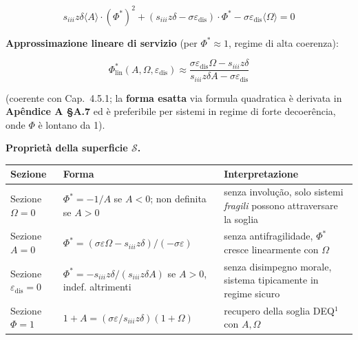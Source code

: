 \[
s_{iii} z \delta \langle A\rangle \cdot (\Phi^*)^2 + (s_{iii} z \delta - \sigma \varepsilon_{\text{dis}}) \cdot \Phi^* - \sigma \varepsilon_{\text{dis}} \langle\Omega\rangle = 0
\]

\Hypoth{} \textbf{Approssimazione lineare di servizio} (per
\(\Phi^* \approx 1\), regime di alta coerenza):

\[
\Phi^*_{\text{lin}}(A, \Omega, \varepsilon_{\text{dis}}) \approx \frac{\sigma \varepsilon_{\text{dis}} \Omega - s_{iii} z \delta}{s_{iii} z \delta A - \sigma \varepsilon_{\text{dis}}}
\]

(coerente con Cap.~4.5.1; la \textbf{forma esatta} via formula
quadratica è derivata in \textbf{Apêndice A \S{}A.7} ed è preferibile per
sistemi in regime di forte decoerência, onde \(\Phi\) è lontano da 1).

\Proved{} \textbf{Proprietà della superficie \(\mathcal{S}\).}

{\def\LTcaptype{none} %
{\small\begin{longtable}[]{@{}
  >{\raggedright\arraybackslash}p{}
  >{\raggedright\arraybackslash}p{}
  >{\raggedright\arraybackslash}p{}@{}}
\toprule\noalign{}
\begin{minipage}[b]{\linewidth}\raggedright
Sezione
\end{minipage} & \begin{minipage}[b]{\linewidth}\raggedright
Forma
\end{minipage} & \begin{minipage}[b]{\linewidth}\raggedright
Interpretazione
\end{minipage} \\
\midrule\noalign{}
\endhead
\bottomrule\noalign{}
\endlastfoot
Sezione \(\Omega = 0\) & \(\Phi^* = -1/A\) se \(A < 0\); non definita se
\(A > 0\) & senza involução, solo sistemi \emph{fragili} possono
attraversare la soglia \\
Sezione \(A = 0\) &
\(\Phi^* = (\sigma\varepsilon\Omega - s_{iii}z\delta) / (-\sigma\varepsilon)\)
& senza antifragilidade, \(\Phi^*\) cresce linearmente con \(\Omega\) \\
Sezione \(\varepsilon_{\text{dis}} = 0\) &
\(\Phi^* = -s_{iii}z\delta / (s_{iii}z\delta A)\) se \(A > 0\), indef.
altrimenti & senza disimpegno morale, sistema tipicamente in regime
sicuro \\
Sezione \(\Phi = 1\) &
\(1 + A = (\sigma\varepsilon/s_{iii}z\delta)(1 + \Omega)\) & recupero
della soglia DEQ$^1$ con \(A, \Omega\) \\
\end{longtable}}
}

